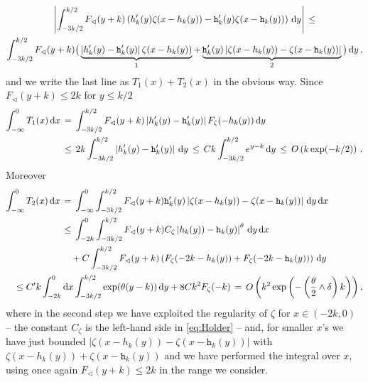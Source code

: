 \documentclass[reqno,11pt]{amsart}
\numberwithin{equation}{section}
\newcommand{\dd}{\,\text{\rm d}}             %
\newcommand{\gd}{\delta}
\newcommand{\gz}{\zeta}
\newcommand{\lar}{\vartriangleleft}
\begin{document}
 \begin{multline}
  \label{eq:passo-interm2}
  \left\vert 
    \int_{-3k/2}^{k/2} F_\lar(y+k) \left(
   h'_k(y) \gz( x-h_k(y))-   \mathtt{h}'_k(y) \gz( x-\mathtt{h}_k(y)) 
\right)    \dd y  \right\vert \, \le 
 \\
  \int_{-3k/2}^{k/2}  F_\lar(y+k)\big(\underbrace{\left\vert 
  h'_k(y) -   \mathtt{h}'_k(y)\right \vert \gz( x-h_k(y))}_{1} +   \underbrace{\mathtt{h}'_k(y)  \left\vert \gz( x-h_k(y))-  \gz( x-\mathtt{h}_k(y))  
\right\vert}_2 \big)   \dd y\, ,
 \end{multline}
 and we write the last line as  $T_1(x)+T_2(x)$ in the obvious way. Since $F_\lar(y+k) \le 2k$ for $y\le k/2$
 \begin{equation}
 \begin{split}
 \int_{-\infty}^0 T_1(x) \dd x \, &=\,   \int_{-3k/2}^{k/2}  F_\lar(y+k)\left\vert 
  h'_k(y) -   \mathtt{h}'_k(y)\right \vert F_\gz( -h_k(y)) \dd y\\
  &\le \, 2 k
   \int_{-3k/2}^{k/2}  \left\vert 
  h'_k(y) -   \mathtt{h}'_k(y)\right \vert  \dd y 
  \, \le \,  C k
   \int_{-3k/2}^{k/2}  e^{y-k}  \dd y \, \le \,  O\left( k \exp(- k/2)\right)\,.
 \end{split}
 \end{equation}
 Moreover
 \begin{equation}
 \begin{split}
 \int_{-\infty}^0 T_2(x) \dd x \, &=\,    \int_{-\infty}^0\int_{-3k/2}^{k/2}  F_\lar(y+k)  \mathtt{h}'_k(y)  \left\vert \gz( x-h_k(y))-  \gz( x-\mathtt{h}_k(y))  
\right\vert \dd y \dd x 
\\
& \le \, 
 \int_{-2k}^0\int_{-3k/2}^{k/2}  F_\lar(y+k)  %
 C_\gz \left\vert h_k(y))-  \mathtt{h}_k(y)
\right\vert^\theta \dd y \dd x\\
& \ \ \ + C \int_{-3k/2}^{k/2}  F_\lar(y+k)  %
\left(F_\gz( -2k-h_k(y))+ F_\gz( -2k-\mathtt{h}_k(y))  
\right) 
 \dd y
 \\
  \le  C' k \int_{-2k}^0  &\dd x \int_{-3k/2}^{k/2}   
 \exp(\theta(y-k)) \dd y + 8Ck^2 F_\gz( -k)\, =\, O\left( k^2 \exp\left(-\left(\frac \theta 2\wedge \gd\right) k\right) \right),
\end{split}
 \end{equation}
 where in the second step we have exploited the regularity of $\gz$ for $x\in (-2k, 0)$ --
 the constant $C_\gz$ is the left-hand side in \eqref{eq:Holder} -- and, for smaller $x$'s we have just bounded $ \vert \gz( x-h_k(y))-  \gz( x-\mathtt{h}_k(y))\vert$ with
 $  \gz( x-h_k(y))+  \gz( x-\mathtt{h}_k(y))$ and we have performed the integral over $x$, using once again $ F_\lar(y+k)\le 2k$ in the range we consider.
\end{document}
